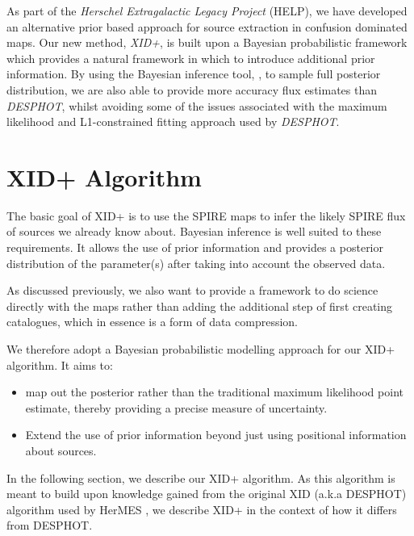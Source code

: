 \documentclass[useAMS,usenatbib]{mnras}
\begin{document}
 As part of the \emph{Herschel Extragalactic Legacy Project} (HELP), we have developed an alternative prior based approach for source extraction in confusion dominated maps. Our new method, \emph{XID+}, is built upon a Bayesian probabilistic framework which provides a natural framework in which to introduce additional prior information. By using the Bayesian inference tool, \citep[\emph{Stan}]{}, to sample full posterior distribution, we are also able to provide more accuracy flux estimates than \emph{DESPHOT}, whilst avoiding some of the issues associated with the maximum likelihood and L1-constrained fitting approach used by \emph{DESPHOT}.
 
\section{XID+ Algorithm}
The basic goal of XID+ is to use the SPIRE maps to infer the likely SPIRE flux of sources we already know about. Bayesian inference is well suited to these requirements. It allows the use of prior information and provides a posterior distribution of the parameter(s) after taking into account the observed data.  

As discussed previously, we also want to provide a framework to do science directly with the maps rather than adding the additional step of first creating catalogues, which in essence is a form of data compression.

We therefore adopt a Bayesian probabilistic modelling approach for our XID+ algorithm. It aims to:
\begin{itemize}
\item map out the posterior rather than the traditional maximum likelihood point estimate, thereby providing a precise measure of uncertainty. 
\item Extend the use of prior information beyond just using positional information about sources.
\end{itemize}

In the following section, we describe our XID+ algorithm. As this algorithm is meant to build upon knowledge gained from the original XID (a.k.a DESPHOT) algorithm used by HerMES \citep{Roseboom:2010, Roseboom:2011, Wang:2014}, we describe XID+ in the context of how it differs from DESPHOT. 

\end{document}
